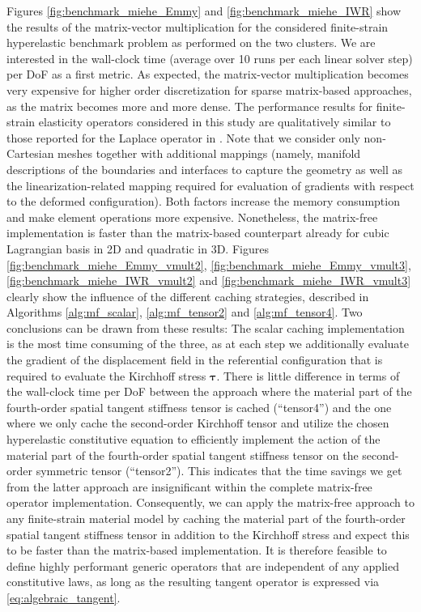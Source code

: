 \documentclass[times,doublespace]{nmeauth}
\def\gz  #1{           \mbox{$\boldsymbol{#1}$}}
\begin{document}
Figures \ref{fig:benchmark_miehe_Emmy} and \ref{fig:benchmark_miehe_IWR} show the results of the matrix-vector multiplication for the considered finite-strain hyperelastic benchmark problem as performed on the two clusters.
{\color{red}
We are interested in the wall-clock time (average over 10 runs per each linear solver step) per DoF as a first metric.}
As expected, the matrix-vector multiplication becomes very expensive for higher order discretization for sparse matrix-based approaches,
{\color{red}as the matrix becomes more and more dense.
The performance results for finite-strain elasticity operators considered in this study are qualitatively similar to those reported for the Laplace operator in \cite{kronbichler12}.
Note that we consider only non-Cartesian meshes together with additional mappings (namely, manifold descriptions of the boundaries and interfaces to capture the geometry as well as
the linearization-related mapping required for evaluation of gradients with respect to the deformed configuration).
Both factors increase the memory consumption and make element operations more expensive.
Nonetheless, }
the matrix-free implementation is faster than the matrix-based counterpart already for cubic Lagrangian basis in 2D and quadratic in 3D.
Figures \ref{fig:benchmark_miehe_Emmy_vmult2}, \ref{fig:benchmark_miehe_Emmy_vmult3}, \ref{fig:benchmark_miehe_IWR_vmult2} and \ref{fig:benchmark_miehe_IWR_vmult3} clearly show the influence of the different caching strategies,
{\color{red}
described in Algorithms \ref{alg:mf_scalar}, \ref{alg:mf_tensor2} and \ref{alg:mf_tensor4}.}
Two conclusions can be drawn from these results:
The scalar caching implementation is the most time consuming of the three, as at each step we additionally evaluate the gradient of the displacement field in the referential configuration that is required to evaluate the Kirchhoff stress $\gz \tau$.
There is little difference {\color{red}in terms of the wall-clock time per DoF} between the approach where the material part of the fourth-order spatial tangent stiffness tensor is cached (``tensor4'') and the one where we only cache the second-order Kirchhoff tensor and utilize the chosen hyperelastic constitutive equation to efficiently implement the action of the material part of the fourth-order spatial tangent stiffness tensor on the second-order symmetric tensor (``tensor2'').
This indicates that the time savings we get from the latter approach are insignificant within the complete matrix-free operator implementation.
Consequently, we can apply the matrix-free approach to any finite-strain material model by caching the material part of the fourth-order spatial tangent stiffness tensor in addition to the Kirchhoff stress and expect this to be faster than the matrix-based implementation.
It is therefore feasible to define highly performant generic operators that are independent of any applied constitutive laws,
{\color{red}as long as the resulting tangent operator is expressed via \eqref{eq:algebraic_tangent}.}
\end{document}
